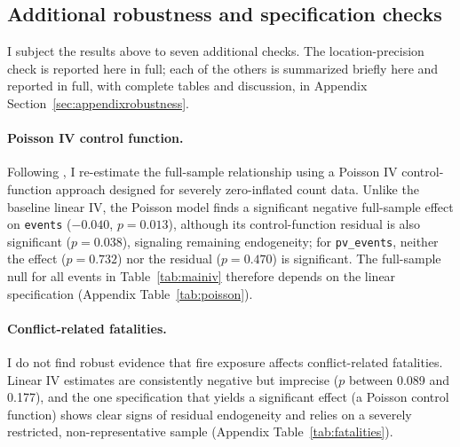 \documentclass[12pt]{article}
\begin{document}
\subsection{Additional robustness and specification checks}
\label{sec:robustness-summary}

I subject the results above to seven additional checks. The location-precision check is reported here in full; each of the others is summarized briefly here and reported in full, with complete tables and discussion, in Appendix Section~\ref{sec:appendixrobustness}.

\paragraph{Poisson IV control function.} Following \citet{lu2023fish}, I re-estimate the full-sample relationship using a Poisson IV control-function approach \citep{terzabasurathouz2008} designed for severely zero-inflated count data. Unlike the baseline linear IV, the Poisson model finds a significant negative full-sample effect on \texttt{events} ($-0.040$, $p=0.013$), although its control-function residual is also significant ($p=0.038$), signaling remaining endogeneity; for \texttt{pv\_events}, neither the effect ($p=0.732$) nor the residual ($p=0.470$) is significant. The full-sample null for all events in Table~\ref{tab:mainiv} therefore depends on the linear specification (Appendix Table~\ref{tab:poisson}).

\paragraph{Conflict-related fatalities.} I do not find robust evidence that fire exposure affects conflict-related fatalities. Linear IV estimates are consistently negative but imprecise ($p$ between 0.089 and 0.177), and the one specification that yields a significant effect (a Poisson control function) shows clear signs of residual endogeneity and relies on a severely restricted, non-representative sample (Appendix Table~\ref{tab:fatalities}).
\end{document}
